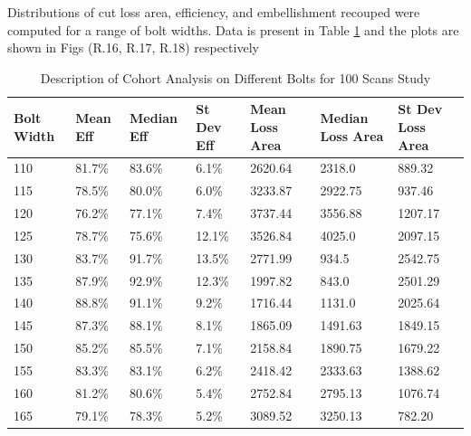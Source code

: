 \newpage
Distributions of cut loss area, efficiency, and embellishment recouped were computed for a range of bolt widths. Data is present in Table \ref{tab:cohort_analysis} and the plots are shown in Figs (R.16, R.17, R.18) respectively

\begin{table} [H]
    \centering
    \begin{tabular}{p{2cm}|p{2cm}|p{2cm}|p{2cm}|p{2cm}|p{2cm}|p{2cm}}
        \textbf{Bolt Width} & \textbf{Mean Eff} & \textbf{Median Eff} & \textbf{St Dev Eff} & \textbf{Mean Loss Area} & \textbf{Median Loss Area} & \textbf{St Dev Loss Area}\\
        \hline %
        110& 81.7\% & 83.6\% & 6.1\% & 2620.64 & 2318.0 & 889.32\\
        115& 78.5\% & 80.0\% & 6.0\% & 3233.87 & 2922.75 & 937.46\\
        120& 76.2\% & 77.1\% & 7.4\% & 3737.44 & 3556.88 & 1207.17\\
        125& 78.7\% & 75.6\% & 12.1\% & 3526.84 & 4025.0 & 2097.15\\
        130& 83.7\% & 91.7\% & 13.5\% & 2771.99 & 934.5 & 2542.75\\
        135& 87.9\% & 92.9\% & 12.3\% & 1997.82 & 843.0 & 2501.29\\
        140& 88.8\% & 91.1\% & 9.2\% & 1716.44 & 1131.0 & 2025.64\\
        145& 87.3\% & 88.1\% & 8.1\% & 1865.09 & 1491.63 & 1849.15\\
        150& 85.2\% & 85.5\% & 7.1\% & 2158.84 & 1890.75 & 1679.22\\
        155& 83.3\% & 83.1\% & 6.2\% & 2418.42 & 2333.63 & 1388.62\\
        160& 81.2\% & 80.6\% & 5.4\% & 2752.84 & 2795.13 & 1076.74\\
        165& 79.1\% & 78.3\% & 5.2\% & 3089.52 & 3250.13 & 782.20\\
        \end{tabular}
    \caption{Description of Cohort Analysis on Different Bolts for 100 Scans Study}
    \label{tab:cohort_analysis}
\end{table}


